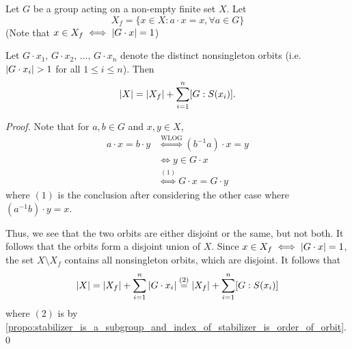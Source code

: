 \begin{thm}
\label{thm:orbit_decomposition_theorem}
  Let $G$ be a group acting on a non-empty finite set $X$. Let
  \begin{equation*}
    X_f = \{x \in X : a \cdot x = x, \forall a \in G \}
  \end{equation*}
  (Note that $x \in X_f \iff \left|G \cdot x\right| = 1$)

  Let $G \cdot x_1, \, G \cdot x_2, \, ..., \, G \cdot x_n$ denote the distinct nonsingleton orbits (i.e. $\left|G \cdot x_i\right| > 1$ for all $1 \leq i \leq n$). Then
  \begin{equation*}
    \left|X\right| = \left|X_f\right| + \sum_{i = 1}^{n} [ G : S(x_i) ].
  \end{equation*}
\end{thm}

\begin{proof}
  Note that for $a, b \in G$ and $x, y \in X$,
  \begin{align*}
    a \cdot x = b \cdot y &\overset{\text{WLOG}}{\iff} (b^{-1}a) \cdot x = y \\
          &\iff y \in G \cdot x \\
          &\overset{(1)}{\iff} G \cdot x = G \cdot y
  \end{align*}
  where $(1)$ is the conclusion after considering the other case where $(a^{-1}b) \cdot y = x$.

  Thus, we see that the two orbits are either disjoint or the same, but not both. It follows that the orbits form a disjoint union of $X$. Since  $x \in X_f \iff \left|G \cdot x\right| = 1$, the set $X \setminus X_f$ contains all nonsingleton orbits, which are disjoint. It follows that
  \begin{equation*}
    \left|X\right| = \left|X_f\right| + \sum_{i = 1}^{n} \left|G \cdot x_i\right| \overset{(2)}{=} \left|X_f\right| + \sum_{i = 1}^{n} [G : S(x_i)]
  \end{equation*}
  where $(2)$ is by \cref{propo:stabilizer_is_a_subgroup_and_index_of_stabilizer_is_order_of_orbit}.\qed
\end{proof}



